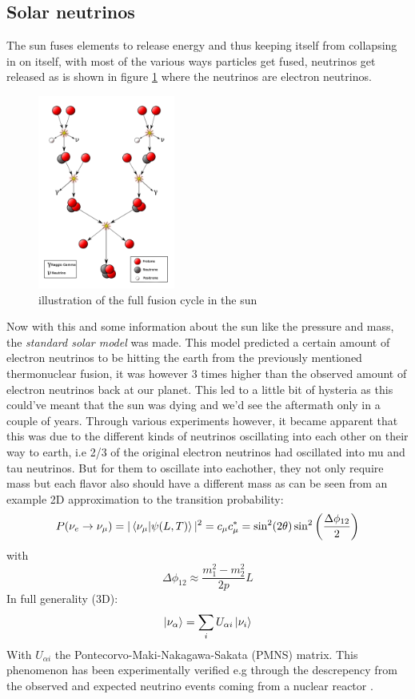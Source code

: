 \documentclass[11pt,a4paper,faculty=we,language=en,doctype=report]{cls/ugent-doc}
\begin{document}
\subsection{Solar neutrinos}
The sun fuses elements to release energy and thus keeping itself from collapsing in 
on itself, with most of the various ways particles get fused, neutrinos get released as 
is shown in figure \ref{fig:SunFusion} where the neutrinos are electron neutrinos.
\begin{figure}
	\centering
	\includegraphics[width=0.4\textwidth]{figures/SunFusion.png}
	\caption{illustration of the full fusion cycle in the sun}
	\label{fig:SunFusion}
\end{figure}
Now with this and some information about the sun like the pressure and mass,
the \textit{standard solar model} was made. This model predicted a certain
amount of electron neutrinos to be hitting the earth from the previously mentioned
thermonuclear fusion, it was however 3 times higher than the observed amount of
electron neutrinos back at our planet. This led to a little bit of hysteria as this could've meant
that the sun was dying and we'd see the aftermath only in a couple of years.
Through various experiments however, it became apparent that this was due to
the different kinds of neutrinos oscillating into each other on their way to
earth, i.e 2/3 of the original electron neutrinos had oscillated into mu and
tau neutrinos. But for them to oscillate into eachother, they not
only require mass but each flavor also should have a different mass as can be seen
from an example 2D approximation to the transition probability\cite{Bellini_2014}:
\begin{equation}
	P(\nu_e\rightarrow\nu_\mu) = |\braket{\nu_\mu|\psi(L,T)}|^2 = c_\mu c_\mu^* = \sin ^2(2 \theta) \sin ^2\left(\frac{\Delta \phi_{12}}{2}\right)
\end{equation}
with
\begin{equation}
	\Delta \phi_{12} \approx \frac{m_1^2 - m_2^2}{2p}L
\end{equation}
In full generality (3D):
\begin{equation}
	\ket{\nu_\alpha} = \sum_iU_{\alpha i} \ket{\nu_i}
\end{equation}
With $U_{\alpha i}$ the Pontecorvo-Maki-Nakagawa-Sakata (PMNS) matrix.  This
phenomenon has been experimentally verified e.g through the descrepency from
the observed and expected neutrino events coming from a nuclear reactor \cite{Eguchi_2003}.
\end{document}

